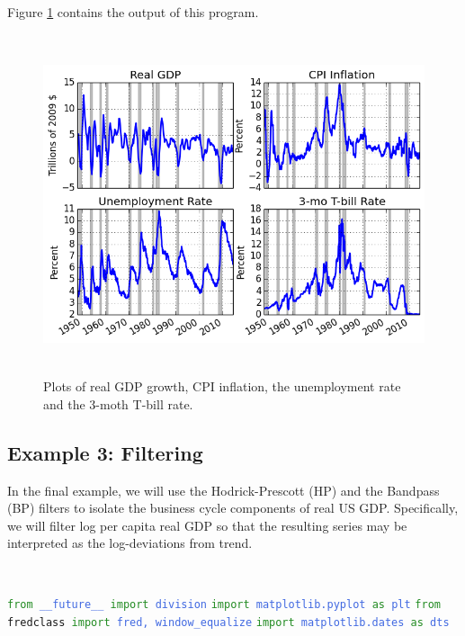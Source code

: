 \documentclass[11pt,fleqn]{article}
\newcommand{\ttt}{\texttt}
\newcommand{\tc}{\textcolor}
\begin{document}
\noindent Figure \ref{fig:2} contains the output of this program.

\begin{figure}[h] \caption{\label{fig:2} Plots of real GDP growth, CPI inflation, the unemployment rate and the 3-moth T-bill rate.}
\begin{center}
\includegraphics[height = 10cm]{fig_fredclass_example2.png}
\end{center}
\end{figure}


\subsection{Example 3: Filtering}

In the final example, we will use the Hodrick-Prescott (HP) and the Bandpass (BP) filters to isolate the business cycle components of real US GDP. Specifically, we will filter log per capita real GDP so that the resulting series may be interpreted as the log-deviations from trend.

\

\begin{minipage}{6.5in}
\ttt{\tc{ForestGreen}{from} \tc{RoyalBlue}{\_\_future\_\_} \tc{ForestGreen}{import} \tc{RoyalBlue}{division}}
\ttt{\tc{ForestGreen}{import} \tc{RoyalBlue}{matplotlib.pyplot} \tc{ForestGreen}{as} \tc{RoyalBlue}{plt}}
\ttt{\tc{ForestGreen}{from} fredclass \tc{ForestGreen}{import} \tc{RoyalBlue}{fred, window\_equalize}}
\ttt{\tc{ForestGreen}{import} \tc{RoyalBlue}{matplotlib.dates} \tc{ForestGreen}{as} \tc{RoyalBlue}{dts}}

\

\end{minipage}
\end{document}
